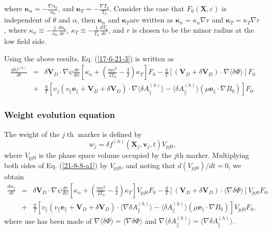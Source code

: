 \documentclass{article}
\newcommand{\tmmathbf}[1]{\ensuremath{\boldsymbol{#1}}}
\newcommand{\tmop}[1]{\ensuremath{\operatorname{#1}}}
\begin{document}
where $\tmmathbf{\kappa}_n = - \frac{\nabla n_0}{n_0}$, and
$\tmmathbf{\kappa}_T = - \frac{\nabla T_0}{T_0}$. Consider the case that $F_0
(\mathbf{X}, \varepsilon)$ is independent of $\theta$ and $\alpha$, then
$\tmmathbf{\kappa}_n$ and $\tmmathbf{\kappa}_T $are written as
$\tmmathbf{\kappa}_n = \kappa_n \nabla r$ and $\tmmathbf{\kappa}_T = \kappa_T
\nabla r$, where $\kappa_n \equiv - \frac{1}{n_0}  \frac{d n_0}{d r}$,
$\kappa_T \equiv - \frac{1}{T_0} \frac{d T_0}{d r}$, and $r$ is chosen to be
the minor radius at the low field side.

Using the above results, Eq. (\ref{17-6-21-3}) is written as
\begin{eqnarray}
  \frac{d \delta f^{(h)}}{d t} & = & \delta \mathbf{V}_D \cdot \nabla \psi
  \frac{d r}{d \psi} \left[ \kappa_n + \left( \frac{m v^2}{2 T_0} -
  \frac{3}{2} \right) \kappa_T \right] F_0 - \frac{q}{T} [(\mathbf{V}_D +
  \delta \mathbf{V}_D) \cdot \nabla \langle \delta \Phi \rangle] F_0
  \nonumber\\
  & + & \frac{q}{T} [v_{\parallel} (v_{\parallel} \mathbf{e}_{\parallel}
  +\mathbf{V}_D + \delta \mathbf{V}_D) \cdot \nabla \langle \delta
  A_{\parallel}^{(h)} \rangle - \langle \delta A_{\parallel}^{(h)} \rangle
  (\mu \mathbf{e}_{\parallel} \cdot \nabla B_0)] F_0 .  \label{21-8-8-a1}
\end{eqnarray}


\subsubsection{Weight evolution equation}

The weight of the $j \tmop{th}$ marker is defined by
\begin{equation}
  w_j = \delta f^{(h)}  (\mathbf{X}_j, \mathbf{v}_j, t) V_{p j 0},
\end{equation}
where $V_{p j 0}$ is the phase space volume occupied by the $j$th marker.
Multiplying both sides of Eq. (\ref{21-8-8-a1}) by $V_{p j 0}$, and noting
that $d (V_{p j 0}) / d t = 0$, we obtain
\begin{eqnarray}
  \frac{d w_j}{d t} & = & \delta \mathbf{V}_D \cdot \nabla \psi \frac{d r}{d
  \psi} \left[ \kappa_n + \left( \frac{m v^2}{2 T_0} - \frac{3}{2} \right)
  \kappa_T \right] V_{p j 0} F_0 - \frac{q}{T} [(\mathbf{V}_D + \delta
  \mathbf{V}_D) \cdot \langle \nabla \delta \Phi \rangle] V_{p j 0} F_0 .
  \nonumber\\
  & + & \frac{q}{T} [v_{\parallel} (v_{\parallel} \mathbf{e}_{\parallel}
  +\mathbf{V}_D + \delta \mathbf{V}_D) \cdot \langle \nabla \delta
  A_{\parallel}^{(h)} \rangle - \langle \delta A_{\parallel}^{(h)} \rangle
  (\mu \mathbf{e}_{\parallel} \cdot \nabla B_0)] V_{p j 0} F_0, 
  \label{17-7-25-1m}
\end{eqnarray}
where use has been made of $\nabla \langle \delta \Phi \rangle = \langle
\nabla \delta \Phi \rangle$ and $\nabla \langle \delta A_{\parallel}^{(h)}
\rangle = \langle \nabla \delta A_{\parallel}^{(h)} \rangle$.
\end{document}
